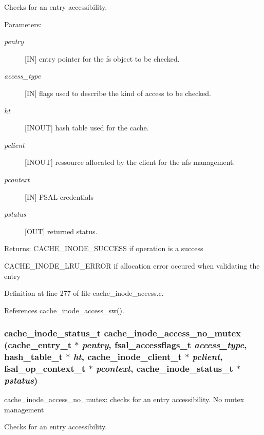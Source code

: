 Checks for an entry accessibility.

\begin{Desc}
\item[Parameters:]
\begin{description}
\item[{\em pentry}][IN] entry pointer for the fs object to be checked. \item[{\em access\_\-type}][IN] flags used to describe the kind of access to be checked. \item[{\em ht}][INOUT] hash table used for the cache. \item[{\em pclient}][INOUT] ressource allocated by the client for the nfs management. \item[{\em pcontext}][IN] FSAL credentials \item[{\em pstatus}][OUT] returned status.\end{description}
\end{Desc}
\begin{Desc}
\item[Returns:]CACHE\_\-INODE\_\-SUCCESS if operation is a success \par
 

CACHE\_\-INODE\_\-LRU\_\-ERROR if allocation error occured when validating the entry \end{Desc}


Definition at line 277 of file cache\_\-inode\_\-access.c.

References cache\_\-inode\_\-access\_\-sw().
\subsubsection{\setlength{\rightskip}{0pt plus 5cm}cache\_\-inode\_\-status\_\-t cache\_\-inode\_\-access\_\-no\_\-mutex (cache\_\-entry\_\-t $\ast$ {\em pentry}, fsal\_\-accessflags\_\-t {\em access\_\-type}, hash\_\-table\_\-t $\ast$ {\em ht}, cache\_\-inode\_\-client\_\-t $\ast$ {\em pclient}, fsal\_\-op\_\-context\_\-t $\ast$ {\em pcontext}, cache\_\-inode\_\-status\_\-t $\ast$ {\em pstatus})}\label{cache__inode__access_8c_a1}


cache\_\-inode\_\-access\_\-no\_\-mutex: checks for an entry accessibility. No mutex management

Checks for an entry accessibility.


